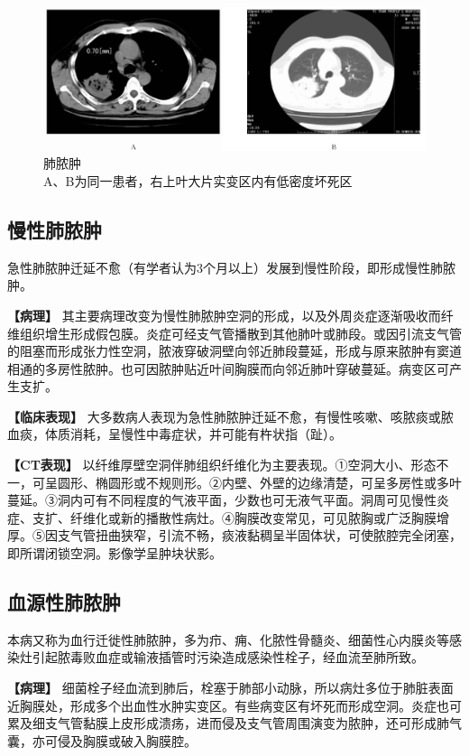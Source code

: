 \begin{figure}[!htbp]
 \centering
 \includegraphics[width=.7\textwidth,height=\textheight,keepaspectratio]{./images/Image00205.jpg}
 \captionsetup{justification=centering}
 \caption{肺脓肿\\{\small A、B为同一患者，右上叶大片实变区内有低密度坏死区}}
 \label{fig9-20}
  \end{figure} 

\subsection{慢性肺脓肿}

急性肺脓肿迁延不愈（有学者认为3个月以上）发展到慢性阶段，即形成慢性肺脓肿。

\textbf{【病理】}
其主要病理改变为慢性肺脓肿空洞的形成，以及外周炎症逐渐吸收而纤维组织增生形成假包膜。炎症可经支气管播散到其他肺叶或肺段。或因引流支气管的阻塞而形成张力性空洞，脓液穿破洞壁向邻近肺段蔓延，形成与原来脓肿有窦道相通的多房性脓肿。也可因脓肿贴近叶间胸膜而向邻近肺叶穿破蔓延。病变区可产生支扩。

\textbf{【临床表现】}
大多数病人表现为急性肺脓肿迁延不愈，有慢性咳嗽、咳脓痰或脓血痰，体质消耗，呈慢性中毒症状，并可能有杵状指（趾）。

\textbf{【CT表现】}
以纤维厚壁空洞伴肺组织纤维化为主要表现。①空洞大小、形态不一，可呈圆形、椭圆形或不规则形。②内壁、外壁的边缘清楚，可呈多房性或多叶蔓延。③洞内可有不同程度的气液平面，少数也可无液气平面。洞周可见慢性炎症、支扩、纤维化或新的播散性病灶。④胸膜改变常见，可见脓胸或广泛胸膜增厚。⑤因支气管扭曲狭窄，引流不畅，痰液黏稠呈半固体状，可使脓腔完全闭塞，即所谓闭锁空洞。影像学呈肿块状影。

\subsection{血源性肺脓肿}

本病又称为血行迁徙性肺脓肿，多为疖、痈、化脓性骨髓炎、细菌性心内膜炎等感染灶引起脓毒败血症或输液插管时污染造成感染性栓子，经血流至肺所致。

\textbf{【病理】}
细菌栓子经血流到肺后，栓塞于肺部小动脉，所以病灶多位于肺脏表面近胸膜处，形成多个出血性水肿实变区。有些病变区有坏死而形成空洞。炎症也可累及细支气管黏膜上皮形成溃疡，进而侵及支气管周围演变为脓肿，还可形成肺气囊，亦可侵及胸膜或破入胸膜腔。


